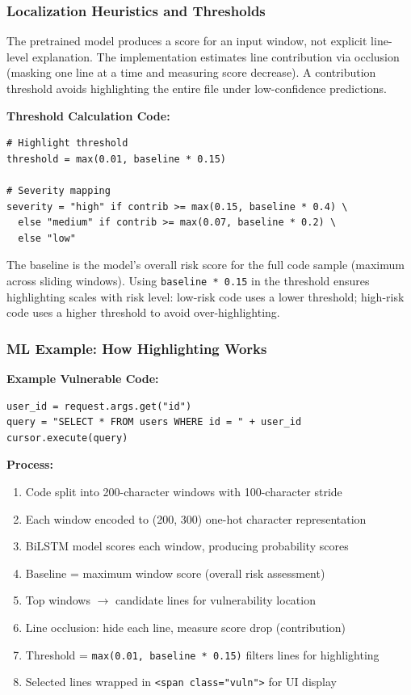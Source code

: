 \subsubsection{Localization Heuristics and Thresholds}
\label{sec:ml_localization}

The pretrained model produces a score for an input window, not explicit line-level explanation. The implementation estimates line contribution via occlusion (masking one line at a time and measuring score decrease). A contribution threshold avoids highlighting the entire file under low-confidence predictions.

\textbf{Threshold Calculation Code:}

\begin{lstlisting}[style=pycode]
# Highlight threshold
threshold = max(0.01, baseline * 0.15)

# Severity mapping
severity = "high" if contrib >= max(0.15, baseline * 0.4) \
  else "medium" if contrib >= max(0.07, baseline * 0.2) \
  else "low"
\end{lstlisting}

The baseline is the model's overall risk score for the full code sample (maximum across sliding windows). Using \texttt{baseline * 0.15} in the threshold ensures highlighting scales with risk level: low-risk code uses a lower threshold; high-risk code uses a higher threshold to avoid over-highlighting.

\subsubsection{ML Example: How Highlighting Works}
\label{sec:ml_highlighting_example}

\textbf{Example Vulnerable Code:}

\begin{lstlisting}[style=pycode]
user_id = request.args.get("id")
query = "SELECT * FROM users WHERE id = " + user_id
cursor.execute(query)
\end{lstlisting}

\textbf{Process:}
\begin{enumerate}
	\item Code split into 200-character windows with 100-character stride
	\item Each window encoded to (200, 300) one-hot character representation
	\item BiLSTM model scores each window, producing probability scores
	\item Baseline = maximum window score (overall risk assessment)
	\item Top windows $\rightarrow$ candidate lines for vulnerability location
	\item Line occlusion: hide each line, measure score drop (contribution)
	\item Threshold = \texttt{max(0.01, baseline * 0.15)} filters lines for highlighting
	\item Selected lines wrapped in \texttt{<span class="vuln">} for UI display
\end{enumerate}

